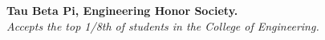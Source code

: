 \documentclass{article}
\begin{document}
\noindent
\textbf{Tau Beta Pi, Engineering Honor Society.} \\
\hspace*{1.5mm}
\textit{Accepts the top 1/8th of students in the College of Engineering.} \\



\end{document}
